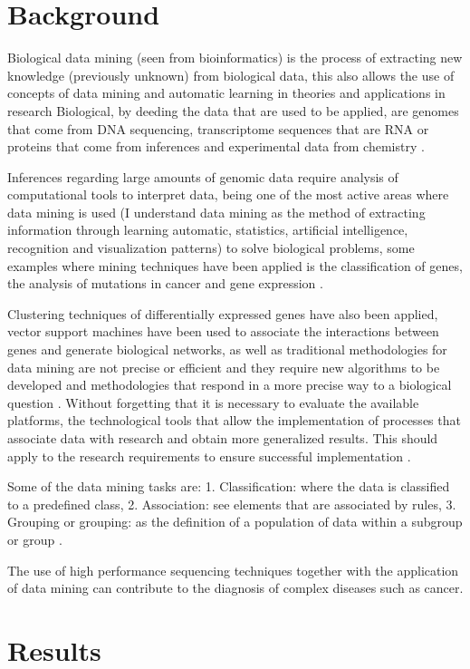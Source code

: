 \documentclass[twocolumn]{bmcart}%
\begin{document}
\section*{Background}
Biological data mining (seen from bioinformatics) is the process of extracting new knowledge (previously unknown) from biological data, this also allows the use of concepts of data mining and automatic learning in theories and applications in research Biological, by deeding the data that are used to be applied, are genomes that come from DNA sequencing, transcriptome sequences that are RNA or proteins that come from inferences and experimental data from chemistry \cite{Farid2016}.

Inferences regarding large amounts of genomic data require analysis of computational tools to interpret data, being one of the most active areas where data mining is used (I understand data mining as the method of extracting information through learning automatic, statistics, artificial intelligence, recognition and visualization patterns) to solve biological problems, some examples where mining techniques have been applied is the classification of genes, the analysis of mutations in cancer and gene expression \cite{Littlefield}.

Clustering techniques of differentially expressed genes have also been applied, vector support machines have been used to associate the interactions between genes and generate biological networks, as well as traditional methodologies for data mining are not precise or efficient and they require new algorithms to be developed and methodologies that respond in a more precise way to a biological question \cite{Zaki2007}. Without forgetting that it is necessary to evaluate the available platforms, the technological tools that allow the implementation of processes that associate data with research and obtain
more generalized results. This should apply to the research requirements to ensure successful implementation \cite{Zaki2007}.

Some of the data mining tasks are: 1. Classification: where the data is classified to a predefined class, 2. Association: see elements that are associated by rules, 3. Grouping or grouping: as the definition of a population of data within a subgroup or group \cite{Littlefield}.

The use of high performance sequencing techniques together with the application of data mining can contribute to the diagnosis of complex diseases such as cancer\cite{Hannah-Shmouni2015,Kawashima2017}.
\section*{Results}
\end{document}
